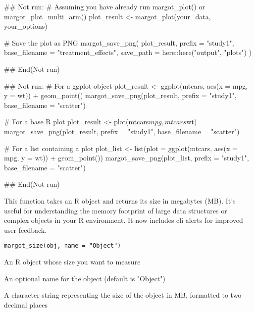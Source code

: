 \documentclass[a4paper]{book}
\begin{document}
\begin{Examples}
\begin{ExampleCode}
## Not run: 
# Assuming you have already run margot_plot() or margot_plot_multi_arm()
plot_result <- margot_plot(your_data, your_options)

# Save the plot as PNG
margot_save_png(
  plot_result,
  prefix = "study1",
  base_filename = "treatment_effects",
  save_path = here::here("output", "plots")
)

## End(Not run)

## Not run: 
# For a ggplot object
plot_result <- ggplot(mtcars, aes(x = mpg, y = wt)) + geom_point()
margot_save_png(plot_result, prefix = "study1", base_filename = "scatter")

# For a base R plot
plot_result <- plot(mtcars$mpg, mtcars$wt)
margot_save_png(plot_result, prefix = "study1", base_filename = "scatter")

# For a list containing a plot
plot_list <- list(plot = ggplot(mtcars, aes(x = mpg, y = wt)) + geom_point())
margot_save_png(plot_list, prefix = "study1", base_filename = "scatter")

## End(Not run)

\end{ExampleCode}
\end{Examples}
%
\begin{Description}
This function takes an R object and returns its size in megabytes (MB).
It's useful for understanding the memory footprint of large data structures
or complex objects in your R environment. It now includes cli alerts for
improved user feedback.
\end{Description}
%
\begin{Usage}
\begin{verbatim}
margot_size(obj, name = "Object")
\end{verbatim}
\end{Usage}
%
\begin{Arguments}
\begin{ldescription}
\item[\code{obj}] An R object whose size you want to measure

\item[\code{name}] An optional name for the object (default is "Object")
\end{ldescription}
\end{Arguments}
%
\begin{Value}
A character string representing the size of the object in MB,
formatted to two decimal places
\end{Value}
\end{document}
